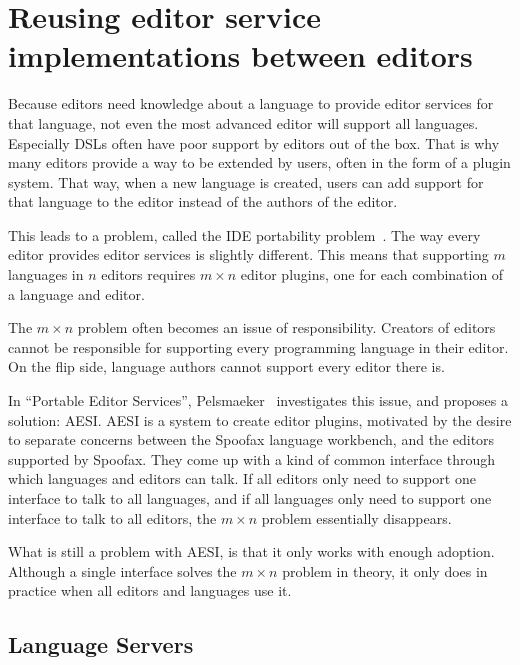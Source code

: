 \section{Reusing editor service implementations between editors}\label{sec:reusing-editor-services-between-editors}

Because editors need knowledge about a language to provide editor services for that language, not even
the most advanced editor will support all languages.
Especially \acp{DSL} often have poor support by editors out of the box.
That is why many editors provide a way to be extended by users, often in the form of a plugin system.
That way, when a new language is created, users can add support for that language to the editor instead of the authors of the editor.

This leads to a problem, called the \ac{IDE} portability problem~\autocite{KeidelPE16}.
The way every editor provides editor services is slightly different.
This means that supporting $m$ languages in $n$ editors requires $m \times n$ editor plugins, one for each
combination of a language and editor.

The $m \times n$ problem often becomes an issue of responsibility.
Creators of editors cannot be responsible for supporting every programming language in their editor.
On the flip side, language authors cannot support every editor there is.

In ``Portable Editor Services'', Pelsmaeker~\autocite*{Pelsmaeker2018} investigates this issue, and proposes a solution: \ac{AESI}.
\ac{AESI} is a system to create editor plugins, motivated by the desire to separate concerns between the Spoofax language workbench,
and the editors supported by Spoofax.
They come up with a kind of common interface through which languages and editors can talk.
If all editors only need to support one interface to talk to all languages, and if all languages only need to support one
interface to talk to all editors, the $m \times n$ problem essentially disappears.

What is still a problem with \ac{AESI}, is that it only works with enough adoption.
Although a single interface solves the $m \times n$ problem in theory, it only does in practice when all editors and languages use it.

\subsection{Language Servers}\label{subsec:language-servers}

